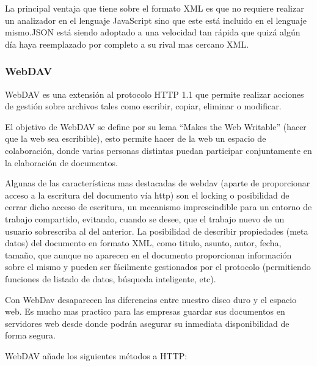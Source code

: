 La principal ventaja que tiene sobre el formato XML es que no requiere realizar un analizador en el lenguaje JavaScript sino que este está incluido en el lenguaje mismo.\newline JSON está siendo adoptado a una velocidad tan rápida que quizá algún día haya reemplazado por completo a su rival mas cercano XML.


\subsubsection*{WebDAV}
\label{tec:webdav}

WebDAV es una extensión al protocolo HTTP 1.1 que permite realizar acciones de gestión sobre archivos tales como escribir, copiar, eliminar o modificar.

El objetivo de WebDAV se define por su lema ``Makes the Web Writable'' (hacer que la web sea escribible), esto permite hacer de la web un espacio de colaboración, donde varias personas distintas puedan participar conjuntamente en la elaboración de documentos.

Algunas de las características mas destacadas de webdav (aparte de proporcionar acceso a la escritura del documento vía http) son el locking o posibilidad de cerrar dicho acceso de escritura, un mecanismo imprescindible para un entorno de trabajo compartido, evitando, cuando se desee, que el trabajo nuevo de un usuario sobrescriba al del anterior. La posibilidad de describir propiedades (meta datos) del documento en formato XML, como titulo, asunto, autor, fecha, tamaño, que aunque no aparecen en el documento proporcionan información sobre el mismo y pueden ser fácilmente gestionados por el protocolo (permitiendo funciones de listado de datos, búsqueda inteligente, etc).

Con WebDav desaparecen las diferencias entre nuestro disco duro y el espacio web. Es mucho mas practico para las empresas guardar sus documentos en servidores web desde donde podrán asegurar su inmediata disponibilidad de forma segura.

WebDAV añade los siguientes métodos a HTTP:

